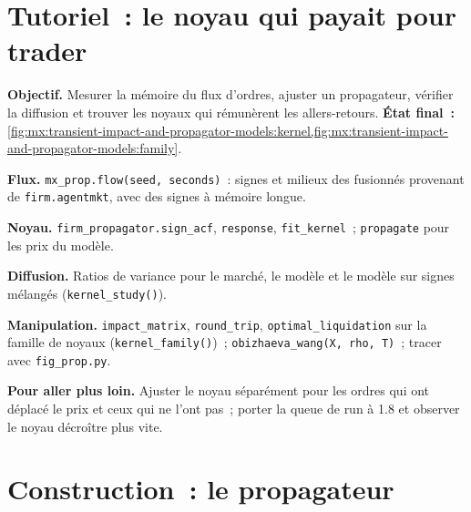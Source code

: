 \section{Tutoriel~: le noyau qui payait pour trader}\label{tut:mx:transient-impact-and-propagator-models:tut}

\begin{tutorial}
\textbf{Objectif.} Mesurer la mémoire du flux d'ordres, ajuster un propagateur, vérifier la diffusion et trouver les noyaux qui rémunèrent les allers-retours.
\textbf{État final~:} \cref{fig:mx:transient-impact-and-propagator-models:kernel,fig:mx:transient-impact-and-propagator-models:family}.
\begin{tutsteps}
\item \textbf{Flux.} \texttt{mx\_prop.flow(seed, seconds)}~: signes et milieux des  fusionnés provenant de \texttt{firm.agentmkt}, avec des signes à mémoire longue.
\item \textbf{Noyau.} \texttt{firm\_propagator.sign\_acf}, \texttt{response}, \texttt{fit\_kernel}~; \texttt{propagate} pour les prix du modèle.
\item \textbf{Diffusion.} Ratios de variance pour le marché, le modèle et le modèle sur signes mélangés (\texttt{kernel\_study()}).
\item \textbf{Manipulation.} \texttt{impact\_matrix}, \texttt{round\_trip}, \texttt{optimal\_liquidation} sur la famille de noyaux (\texttt{kernel\_family()})~;
\texttt{obizhaeva\_wang(X, rho, T)}~; tracer avec \texttt{fig\_prop.py}.
\end{tutsteps}
\textbf{Pour aller plus loin.} Ajuster le noyau séparément pour les ordres qui ont déplacé le prix et ceux qui ne l'ont pas~; porter la queue de run à 1.8 et observer le
noyau décroître plus vite.
\end{tutorial}

\section{Construction~: le propagateur}\label{bld:mx:transient-impact-and-propagator-models:propagator}


